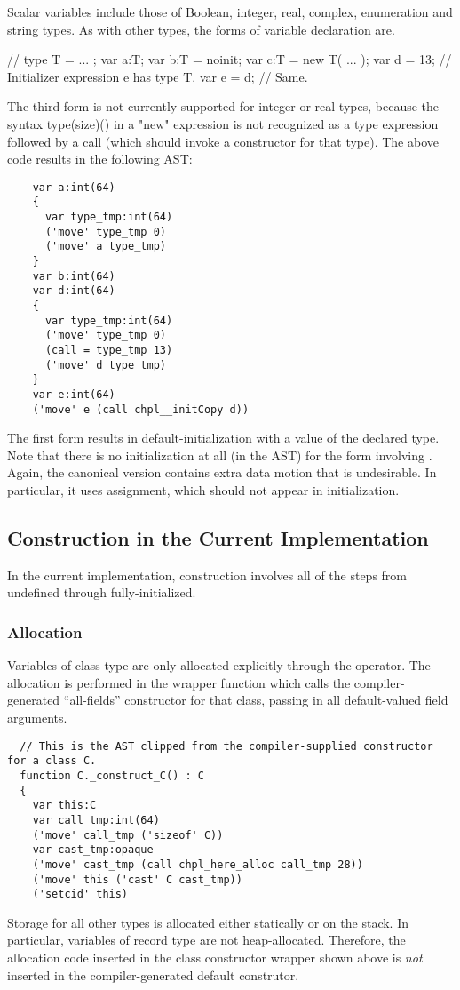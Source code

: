 Scalar variables include those of Boolean, integer, real, complex, enumeration and string
types.  As with other types, the forms of variable declaration are.
\begin{chapel}
// type T = ... ;
   var a:T;
   var b:T = noinit;
   var c:T = new T( ... );
   var d = 13; // Initializer expression e has type T.
   var e = d; // Same.
\end{chapel}
The third form is not currently supported for integer or real types, because the syntax
type(size)() in a "new" expression is not recognized as a type expression followed by a
call (which should invoke a constructor for that type).  The above code results in the
following AST:
\begin{verbatim}
    var a:int(64)
    {
      var type_tmp:int(64)
      ('move' type_tmp 0)
      ('move' a type_tmp)
    }
    var b:int(64)
    var d:int(64)
    {
      var type_tmp:int(64)
      ('move' type_tmp 0)
      (call = type_tmp 13)
      ('move' d type_tmp)
    }
    var e:int(64)
    ('move' e (call chpl__initCopy d))
\end{verbatim}
The first form results in default-initialization with a value of the declared type.
Note that there is no initialization at all (in the AST) for the form
involving .  Again, the canonical version contains extra data motion that
is undesirable.  In particular, it uses assignment, which should not appear in initialization.



\subsection{Construction in the Current Implementation}

In the current implementation, construction involves all of the steps from undefined
through fully-initialized.

\subsubsection{Allocation}

Variables of class type are only allocated explicitly through the  operator.
The allocation is performed in the wrapper function which calls the compiler-generated
``all-fields'' constructor for that class, passing in all default-valued field arguments.
\begin{verbatim}
  // This is the AST clipped from the compiler-supplied constructor for a class C.
  function C._construct_C() : C
  {
    var this:C
    var call_tmp:int(64)
    ('move' call_tmp ('sizeof' C))
    var cast_tmp:opaque
    ('move' cast_tmp (call chpl_here_alloc call_tmp 28))
    ('move' this ('cast' C cast_tmp))
    ('setcid' this)
\end{verbatim}
Storage for all other types is allocated either statically or on the stack.  In particular,
variables of record type are not heap-allocated.  Therefore, the allocation code
inserted in the class constructor wrapper shown above is \emph{not} inserted in the
compiler-generated default construtor.

